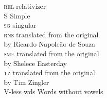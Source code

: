 \begin{multicols}{2}
\begin{tabbing}
\textsc{rel}      \> relativizer\\
S                 \> Simple\\
\textsc{sg}       \> singular\\
\textsc{rns}      \> translated from the original\\ \> by Ricardo Napoleão de Souza\\
\textsc{sme}      \> translated from the original\\ \> by Shelece Easterday\\
\textsc{tz}       \> translated from the original\\ \> by Tim Zingler\\
V-less wds       \> Words without vowels
\end{tabbing}
\end{multicols}
